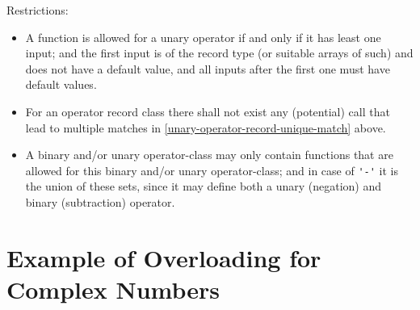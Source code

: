 Restrictions:
\begin{itemize}
\item
  A function is allowed for a unary operator if and only if it has least one input; and the first input is of the record type (or suitable arrays of such) and does not have a default value, and all inputs after the first one must have default values.
\item
  For an operator record class there shall not exist any (potential) call that lead to multiple matches in \cref{unary-operator-record-unique-match} above.
\item
  A binary and/or unary operator-class may only contain functions that are allowed for this binary and/or unary operator-class; and in case of \lstinline!'-'! it is the union of these sets, since it may define both a unary (negation) and binary (subtraction) operator.
\end{itemize}

\section{Example of Overloading for Complex Numbers}\label{example-of-overloading-for-complex-numbers}

